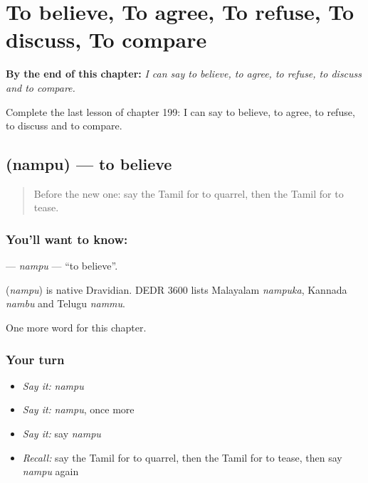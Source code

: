 
\chapter{To believe, To agree, To refuse, To discuss, To compare}
\label{ch:ta-to-believe-to-agree-to-refuse-to-discuss-to-compare}

\begin{chapteropening}
\textbf{By the end of this chapter:} \emph{I can say to believe, to agree, to refuse, to discuss and to compare.}

Complete the last lesson of chapter 199: I can say to believe, to agree, to refuse, to discuss and to compare.
\end{chapteropening}

\section[\texorpdfstring{\ta{நம்பு} (nampu)}{நம்பு (nampu)}]{ (nampu) — to believe}

\label{lesson:TA-C199-nampu}



\begin{quote}
Before the new one: say the Tamil for to quarrel, then the Tamil for to tease.
\end{quote}

\subsection*{You'll want to know: }
\textbf{} — \emph{nampu} — \textquotedblleft{}to believe\textquotedblright{}.

\begin{cousinweb}
\textbf{} (\emph{nampu}) is native Dravidian. DEDR 3600 lists Malayalam \emph{nampuka}, Kannada \emph{nambu} and Telugu \emph{nammu}.
\end{cousinweb}

\begin{grammarlens}[title={What you've built}]
One more word for this chapter.
\end{grammarlens}

\subsection*{Your turn}
\begin{itemize}
\raggedright
  \item \emph{Say it:} \emph{nampu}
  \item \emph{Say it:} \emph{nampu}, once more
  \item \emph{Say it:} say \emph{nampu}
  \item \emph{Recall:} say the Tamil for to quarrel, then the Tamil for to tease, then say \emph{nampu} again
\end{itemize}

